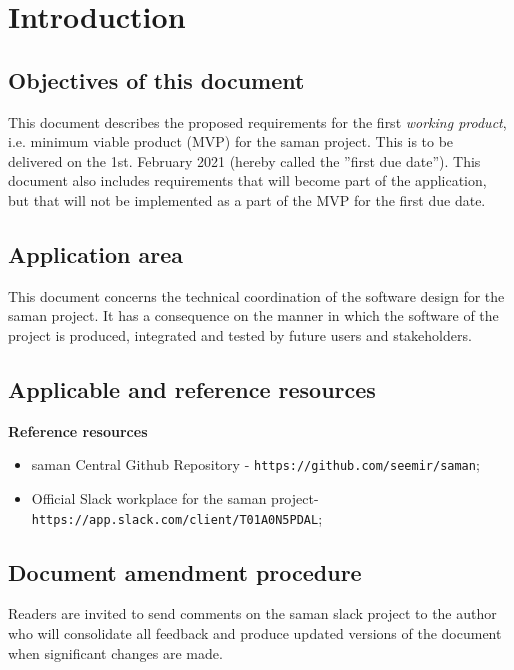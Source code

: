 \section{Introduction}

\subsection{Objectives of this document}
\noindent This document describes the proposed requirements for the first \textit{working product}, i.e. minimum viable product (MVP) for the saman project. This is to be delivered on the 1st. February 2021 (hereby called the ''first due date''). This document also includes requirements that will become part of the application, but that will not be implemented as a part of the MVP for the first due date.

\subsection{Application area}

\noindent This document concerns the technical coordination of the software design for the saman project. It has a consequence on the manner in which the software of the project is produced, integrated and tested by future users and stakeholders.

\subsection{Applicable and reference resources}

\textbf{Reference resources}
\begin{itemize}
    \item saman Central Github Repository - \texttt{https://github.com/seemir/saman};
    \item Official Slack workplace for the saman project\newline - \texttt{https://app.slack.com/client/T01A0N5PDAL};
\end{itemize}

\subsection{Document amendment procedure}

\noindent Readers are invited to send comments on the saman slack project to the author who will consolidate all feedback and produce updated versions of the document when significant changes are made.


